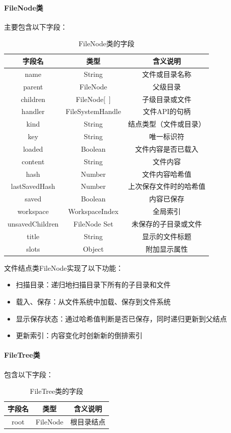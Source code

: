 \documentclass[scheme = chinese]{ctexart}
\begin{document}
\paragraph{FileNode类} 主要包含以下字段：
\begin{table}[H]
    \centering
    \caption{FileNode类的字段}
    \begin{tabular}{ccc}
        \toprule
        字段名 & 类型 & 含义说明 \\
        \midrule
        name & String & 文件或目录名称 \\
        parent & FileNode & 父级目录 \\
        children & FileNode[~] & 子级目录或文件 \\
        handler & FileSystemHandle & 文件API的句柄 \\
        kind & String & 结点类型（文件或目录） \\
        key & String & 唯一标识符 \\
        \midrule
        loaded & Boolean & 文件内容是否已载入 \\
        content & String & 文件内容 \\
        hash & Number & 文件内容哈希值 \\
        lastSavedHash & Number & 上次保存文件时的哈希值 \\
        saved & Boolean & 内容已保存 \\
        workspace & WorkspaceIndex & 全局索引 \\
        \midrule
        unsavedChildren & FileNode Set & 未保存的子目录或文件 \\
        \midrule
        title & String & 显示的文件标题 \\
        slots & Object & 附加显示属性 \\
        \bottomrule
    \end{tabular}
\end{table}

文件结点类FileNode实现了以下功能：
\begin{itemize}
    \item 扫描目录：递归地扫描目录下所有的子目录和文件
    \item 载入、保存：从文件系统中加载、保存到文件系统
    \item 显示保存状态：通过哈希值判断是否已保存，同时递归更新到父结点
    \item 更新索引：内容变化时创新新的倒排索引
\end{itemize}

\paragraph{FileTree类} 包含以下字段：
\begin{table}[H]
    \centering
    \caption{FileTree类的字段}
    \begin{tabular}{ccc}
        \toprule
        字段名 & 类型 & 含义说明 \\
        \midrule
        root & FileNode & 根目录结点 \\
        \bottomrule
    \end{tabular}
\end{table}
\end{document}

